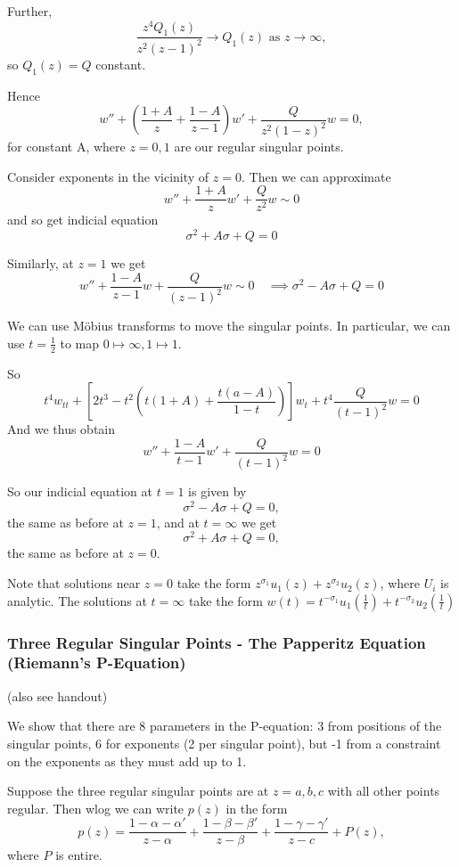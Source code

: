 \documentclass[a4paper]{article}
\begin{document}
Further,
\[
	\frac{z^{4}Q_1(z)}{z^2(z-1)^2} \to Q_1(z) \text{ as } z\to \infty
,\] so $Q_1(z) = Q$ constant. 

Hence
\[
	w'' + \left( \frac{1+A}{z} + \frac{1-A}{z-1} \right)w' + \frac{Q}{z^2(1-z)^2} w = 0
,\] for constant A, where $z = 0, 1$ are our regular singular points.

Consider exponents in the vicinity of $z = 0$. Then we can approximate
\[
w'' + \frac{1+A}{z}w' + \frac{Q}{z^2}w \sim 0
\] 
and so get indicial equation
\[
\sigma^2 + A \sigma + Q = 0
\] 

Similarly, at $z=1$ we get
\[
	w'' + \frac{1-A}{z-1}w + \frac{Q}{(z-1)^2}w \sim 0 \quad \implies \sigma^2 - A\sigma + Q =0
\] 

We can use M\"{o}bius transforms to move the singular points. In particular, we can use $t=\frac{1}{2}$ to map $0 \mapsto \infty, 1 \mapsto 1$.

So \[
	t^{4} w_{t t} + \left[ 2t^3 - t^2\left( t(1+A) + \frac{t(a-A)}{1-t} \right)  \right]w_t + t^{4}\frac{Q}{(t-1)^2} w = 0
\] 
And we thus obtain
\[
	w'' + \frac{1-A}{t-1}w' + \frac{Q}{(t-1)^2}w = 0
\] 

So our indicial equation at $t=1$ is given by
\[
\sigma^2 - A\sigma + Q = 0
,\] the same as before at $z=1$, and at $t=\infty$ we get
\[
\sigma^2 + A\sigma + Q = 0
,\] the same as before at $z=0$.

Note that solutions near  $z=0$ take the form $z^{\sigma_1} u_1(z) + z^{\sigma_2} u_2(z)$, where $U_i$ is analytic. The solutions at $t=\infty$ take the form $w(t) = t^{-\sigma_1}u_1\left(\frac{1}{t}\right) + t^{-\sigma_2} u_2\left( \frac{1}{t} \right) $

\subsubsection{Three Regular Singular Points - The Papperitz Equation (Riemann's P-Equation)}

(also see handout)

We show that there are $8$ parameters in the P-equation: 3 from positions of the singular points, 6 for exponents (2 per singular point), but -1 from a constraint on the exponents as they must add up to 1.

Suppose the three regular singular points are at $z= a, b, c$ with all other points regular. Then wlog we can write $p(z)$ in the form
\[
	p(z) = \frac{1-\alpha - \alpha'}{z-\alpha} + \frac{1-\beta - \beta'}{z-\beta} + \frac{1-\gamma - \gamma'}{z-c} + P(z)
,\] where $P$ is entire.
\end{document}
